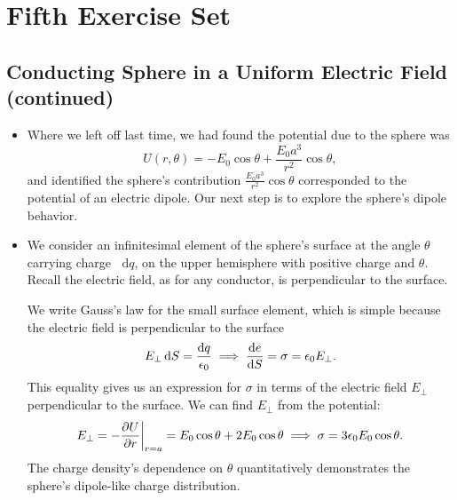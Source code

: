 \documentclass[11pt, a4paper]{article}
\newcommand{\diff}{\mathop{}\!\mathrm{d}} %
\newcommand{\ee}{\epsilon_{0}}  %
\begin{document}
\section{Fifth Exercise Set}

\subsection{Conducting Sphere in a Uniform Electric Field (continued)}
\begin{itemize}
	\item Where we left off last time, we had found the potential due to the sphere was
	\begin{equation*}
		U(r, \theta) = - E_{0} \cos \theta + \frac{E_{0}a^{3}}{r^{2}}\cos \theta,
	\end{equation*}
	and identified the sphere's contribution $ \frac{E_{0}a^{3}}{r^{2}}\cos \theta $ corresponded to the potential of an electric dipole. Our next step is to explore the sphere's dipole behavior.
	
	\item We consider an infinitesimal element of the sphere's surface at the angle $ \theta $ carrying charge $ \diff q $, on the upper hemisphere with positive charge and $ \theta $. Recall the electric field, as for any conductor, is perpendicular to the surface. 
	
	We write Gauss's law for the small surface element, which is simple because the electric field is perpendicular to the surface
	\begin{equation*}
		E_{\perp} \diff S = \frac{\diff q}{\ee} \implies \dv{e}{S} = \sigma = \ee E_{\perp}.
	\end{equation*}
	This equality gives us an expression for $ \sigma $ in terms of the electric field $ E_{\perp} $ perpendicular to the surface. We can find $ E_{\perp} $ from the potential:
	\begin{equation*}
		E_{\perp} = -\pdv{U}{r}\bigg |_{r = a} = E_{0}\cos \theta + 2E_{0}\cos \theta \implies \sigma = 3\ee E_{0} \cos \theta.
	\end{equation*}
	The charge density's dependence on $ \theta $ quantitatively demonstrates the sphere's dipole-like charge distribution. 
	

\end{itemize}
\end{document}

